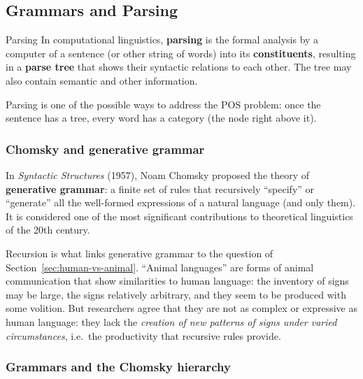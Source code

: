 \subsection{Grammars and Parsing}
\label{sec:grammars-parsing}

\begin{nbdef}{Parsing}
In computational linguistics, \textbf{parsing} is the formal analysis by a computer of a
sentence (or other string of words) into its \textbf{constituents}, resulting in a
\textbf{parse tree} that shows their syntactic relations to each other. The tree may also
contain semantic and other information.
\end{nbdef}

Parsing is one of the possible ways to address the POS problem: once the sentence has a
tree, every word has a category (the node right above it).

\subsubsection{Chomsky and generative grammar}

In \emph{Syntactic Structures} (1957), Noam Chomsky proposed the theory of
\textbf{generative grammar}: a finite set of rules that recursively ``specify'' or
``generate'' all the well-formed expressions of a natural language (and only them). It
is considered one of the most significant contributions to theoretical linguistics of
the 20th century.

Recursion is what links generative grammar to the question of
Section~\ref{sec:human-vs-animal}. ``Animal languages'' are forms of animal communication
that show similarities to human language: the inventory of signs may be large, the signs
relatively arbitrary, and they seem to be produced with some volition. But researchers
agree that they are not as complex or expressive as human language: they lack the
\emph{creation of new patterns of signs under varied circumstances}, i.e.\ the
productivity that recursive rules provide.

\subsubsection{Grammars and the Chomsky hierarchy}

